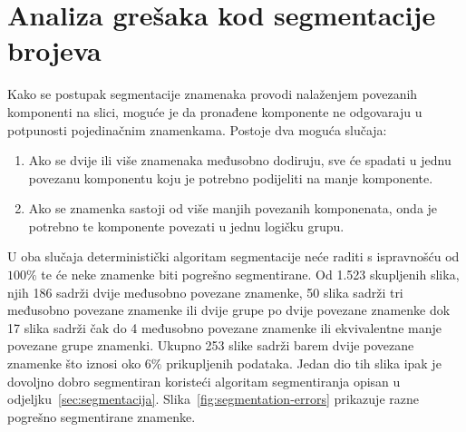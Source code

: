 \section{Analiza grešaka kod segmentacije brojeva}
Kako se postupak segmentacije znamenaka provodi nalaženjem povezanih komponenti na slici, moguće je da pronađene
komponente ne odgovaraju u potpunosti pojedinačnim znamenkama. Postoje dva moguća slučaja:
\begin{enumerate}
    \item Ako se dvije ili više znamenaka međusobno dodiruju, sve će spadati u jednu povezanu komponentu koju je
    potrebno podijeliti na manje komponente.
    \item Ako se znamenka sastoji od više manjih povezanih komponenata, onda je potrebno te komponente povezati u jednu
    logičku grupu.
\end{enumerate}
U oba slučaja deterministički algoritam segmentacije neće raditi s  ispravnošću od $100\%$ te će neke znamenke biti
pogrešno segmentirane. Od 1.523 skupljenih slika, njih 186 sadrži dvije međusobno povezane znamenke, 50 slika sadrži tri
međusobno povezane znamenke ili dvije grupe po dvije povezane znamenke dok 17 slika sadrži čak do 4 međusobno povezane
znamenke ili ekvivalentne manje povezane grupe znamenki. Ukupno 253 slike sadrži barem dvije povezane znamenke što
iznosi oko $6\%$ prikupljenih podataka. Jedan dio tih slika ipak je dovoljno dobro segmentiran koristeći algoritam
segmentiranja opisan u odjeljku\ \ref{sec:segmentacija}. Slika\ \ref{fig:segmentation-errors} prikazuje razne pogrešno
segmentirane znamenke.
